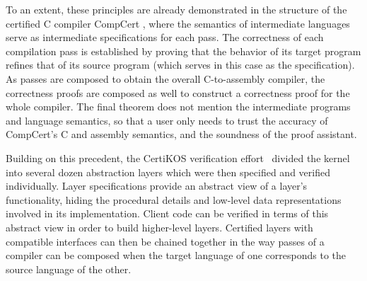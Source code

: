 \documentclass[sigplan,screen]{acmart}
\begin{document}

To an extent,
these principles are already demonstrated in the structure of the
certified C compiler CompCert \cite{compcert},
where the semantics of intermediate languages
serve as intermediate specifications for each pass.
The correctness of each compilation pass is established by
proving that the behavior of its target program
refines that of its source program
(which serves in this case as the specification).
As passes are composed to obtain the overall
C-to-assembly compiler,
the correctness proofs are composed as well
to construct a correctness proof for the whole compiler.
The final theorem does not mention the intermediate
programs and language semantics,
so that a user only needs to trust
the accuracy of CompCert's C and assembly semantics,
and the soundness of the proof assistant.

Building on this precedent,
the CertiKOS verification effort~\cite{popl15,ccal,osdi16}
divided the kernel into several dozen abstraction layers
which were then specified and verified individually.
Layer specifications provide
an abstract view of a layer's functionality,
hiding the procedural details and low-level data representations
involved in its implementation.
Client code can be verified in terms of
this abstract view
in order to build higher-level layers.
Certified layers
with compatible interfaces can then be chained together
in the way passes of a compiler
can be composed when the target language of one
corresponds to the source language of the other.
\end{document}
